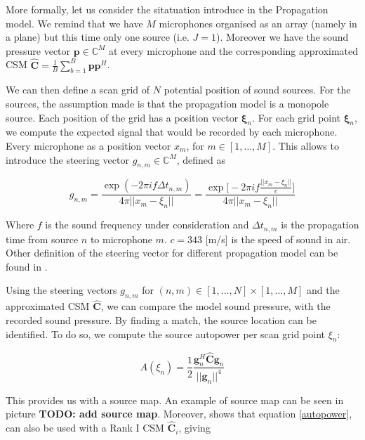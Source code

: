 \documentclass{article}
\begin{document}
More formally, let us consider the sitatuation introduce in the Propagation model. We remind that we have $M$ microphones organised as an array (namely in a plane) but this time only one source (i.e. $J = 1$). Moreover we have the sound pressure vector $\mathbf{p} \in \mathbb{C}^M$ at every microphone and the corresponding approximated CSM $\hat{\mathbf{C}} = \frac{1}{B} \sum_{b = 1}^{B} \mathbf{p}\mathbf{p}^H$.

We can then define a scan grid of $N$ potential position of sound sources. For the sources, the assumption made is that the propagation model is a monopole source. Each position of the grid has a position vector $\mathbf{\xi}_n$. For each grid point $\mathbf{\xi}_n$, we compute the expected signal that would be recorded by each microphone. Every microphone as a position vector $x_m$, for $m \in [1, \dots, M]$. This allows to introduce the  steering vector $g_{n,m} \in \mathbb{C}^M$, defined as 

\begin{equation}
    g_{n,m} = \frac{\exp(-2 \pi i f \Delta t_{n,m})}{4\pi ||x_m -\xi_n||}
    = \frac{\exp \biggl[ -2 \pi i f \frac{||x_m -\xi_n||}{c} \biggr] }{4\pi ||x_m -\xi_n||}  
\end{equation}


Where $f$ is the sound frequency under consideration and $\Delta t_{n,m}$ is the propagation time from source $n$ to microphone $m$. $c = 343$ [m/s] is the speed of sound in air. Other definition of the steering vector for different propagation model can be found in \cite{sarradj2012three}.

Using the steering vectors $g_{n,m}$ for $(n,m) \in [1, \dots, N] \times [1, \dots, M]$ and the approximated CSM $\hat{\mathbf{C}}$, we can compare the model sound pressure, with the recorded sound pressure. By finding a match, the source location can be identified. To do so, we compute the source autopower per scan grid point $\xi_n$:

\begin{equation}
    \label{autopower}
    A(\xi_n) = \frac{1}{2} \frac{\mathbf{g}_{n}^H \hat{\mathbf{C}} \mathbf{g}_{n}}{||\mathbf{g}_{n}||^4}
\end{equation}

This provides us with a source map. An example of source map can be seen in picture \textbf{TODO: add source map}. Moreover, \cite{sarradj2010fast} shows that equation \ref{autopower}, can also be used with a Rank I CSM $\hat{\mathbf{C}}_i$, giving
\end{document}
